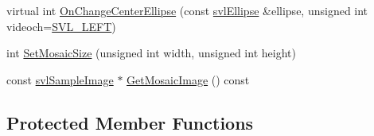 \begin{DoxyCompactItemize}
virtual int \hyperlink{classsvl_filter_image_tracker_a70615f5930aac32a80f90966eb10b11b}{On\+Change\+Center\+Ellipse} (const \hyperlink{structsvl_ellipse}{svl\+Ellipse} \&ellipse, unsigned int videoch=\hyperlink{svl_definitions_8h_ab9fec7615f19c8df2919eebcab0b187f}{S\+V\+L\+\_\+\+L\+E\+F\+T})
\item 
int \hyperlink{classsvl_filter_image_tracker_ac8cf1608d9f290d07cbd4b309a3ee3d3}{Set\+Mosaic\+Size} (unsigned int width, unsigned int height)
\item 
const \hyperlink{classsvl_sample_image}{svl\+Sample\+Image} $\ast$ \hyperlink{classsvl_filter_image_tracker_abb0447daedbd2b6785328bee27e9e69b}{Get\+Mosaic\+Image} () const 
\end{DoxyCompactItemize}
\subsection*{Protected Member Functions}

